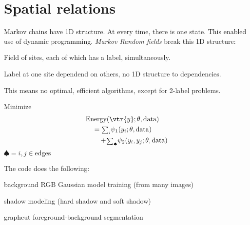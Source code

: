 \section{Spatial relations}
\begin{compactdesc}
\item[\lp{Markov Random Fields}] Markov chains have 1D structure. At every time, there is one state. This enabled use of dynamic programming. \emph{Markov Random fields} break this 1D structure:
		\begin{inparaitem}
			\item Field of sites, each of which has a label, simultaneously.
			\item Label at one site dependend on others, no 1D structure to dependencies. 
			\item This means no optimal, efficient algorithms, except for 2-label problems.
		\end{inparaitem}
	Minimize
	\begin{align*}
		&\text{Energy}(\vtr{y};\theta,\text{data})\\
		&\quad={\scriptstyle\sum_{i}^{}}\psi_1(y_i;\theta,\text{data})\\
		&\qquad+\!{\scriptstyle\sum_{\spadesuit}^{}}\psi_2(y_i,y_j;\theta,\text{data})
	\end{align*}
	$\spadesuit=i,j\in\text{edges}$
\item[\lp{FG-BG segmentation}] The code does the following:
	\begin{inparaitem}
		\item background RGB Gaussian model training (from many images)
		\item shadow modeling (hard shadow and soft shadow)
		\item graphcut foreground-background segmentation
	\end{inparaitem}
\end{compactdesc}
